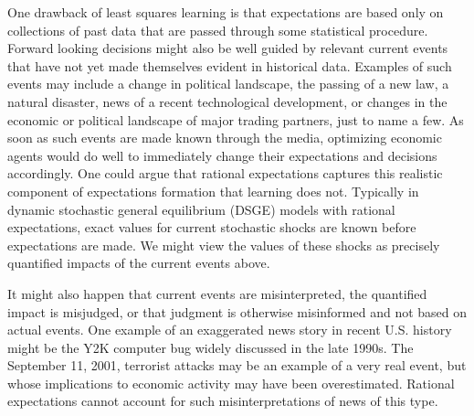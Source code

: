 \documentclass[12pt]{article}
\begin{document}
One drawback of least squares learning is that expectations are based only on collections of past data that are passed through some statistical procedure.  Forward looking decisions might also be well guided by relevant current events that have not yet made themselves evident in historical data.  Examples of such events may include a change in political landscape, the passing of a new law, a natural disaster, news of a recent technological development, or changes in the economic or political landscape of major trading partners, just to name a few.  As soon as such events are made known through the media, optimizing economic agents would do well to immediately change their expectations and decisions accordingly.  One could argue that rational expectations captures this realistic component of expectations formation that learning does not.  Typically in dynamic stochastic general equilibrium (DSGE) models with rational expectations, exact values for current stochastic shocks are known before expectations are made.  We might view the values of these shocks as precisely quantified impacts of the current events above.

It might also happen that current events are misinterpreted, the quantified impact is misjudged, or that judgment is otherwise misinformed and not based on actual events.  One example of an exaggerated news story in recent U.S. history might be the Y2K computer bug widely discussed in the late 1990s.  The September 11, 2001, terrorist attacks may be an example of a very real event, but whose implications to economic activity may have been overestimated.  Rational expectations cannot account for such misinterpretations of news of this type.  
\end{document}
